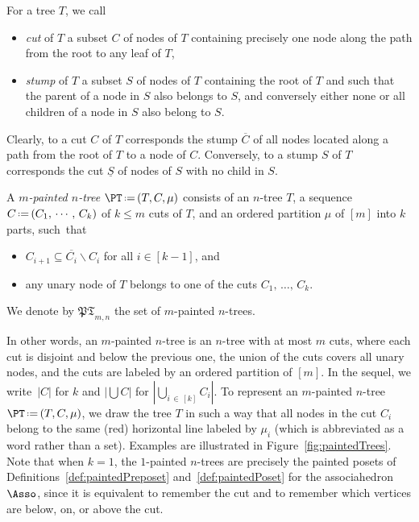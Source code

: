 \documentclass[AHL,Unicode,longabstracts,published]{cedram}
\newcommand{\f}[1]{\mathfrak{#1}}
\newcommand{\ssm}{\smallsetminus}
\newcommand{\eqdef}{\mbox{\,\raisebox{0.2ex}{\scriptsize\ensuremath{\mathrm:}}\ensuremath{=}\,}}
\newcommand{\stump}[1]{\overline{#1}}
\newcommand{\cut}[1]{\underline{#1}}
\begin{document}
\begin{defi}\label{def:stumpCut}
For a tree $T$, we call
\begin{itemize}
\item
\emph{cut} of $T$ a subset $C$ of nodes of $T$ containing precisely one node along the path from the root to any leaf of $T$,
\item
\emph{stump} of $T$ a subset $S$ of nodes of $T$ containing the root of $T$ and such that the parent of a node in $S$ also belongs to $S$, and conversely either none or all children of a node in $S$ also belong to $S$.
\end{itemize}
Clearly, to a cut $C$ of $T$ corresponds the stump $\stump{C}$ of all nodes located along a path from the root of $T$ to a node of $C$. Conversely, to a stump $S$ of $T$ corresponds the cut $\cut{S}$ of nodes of $S$ with no child in $S$.
\end{defi}

\begin{defi}\label{def:paintedTree}
A
\emph{$m$-painted $n$-tree} $\PT \eqdef (T, C, \mu)$ consists of an $n$-tree $T$, a sequence $C \eqdef (C_1,\, \cdots,\,C_k)$ of $k \le m$ cuts of $T$, and an ordered partition $\mu$ of $[m]$ into $k$ parts, such~that
\begin{itemize}
\item $C_{i+1} \subseteq \stump{C_i} \ssm C_i$ for all $i \in [k-1]$, and
\item any unary node of $T$ belongs to one of the cuts $C_1,\,\dots,\, C_k$.
\end{itemize}
We denote by $\f{PT}_{m,n}$ the set of $m$-painted $n$-trees.
\end{defi}

In other words, an $m$-painted $n$-tree is an $n$-tree with at most $m$ cuts, where each cut is disjoint and below the previous one, the union of the cuts covers all unary nodes, and the cuts are labeled by an ordered partition of $[m]$. In the sequel, we write~$|C|$ for $k$ and $|\bigcup C|$ for $|\bigcup_{i\,\in\,[k]} C_i|$. To represent an $m$-painted $n$-tree $\PT \eqdef (T, C, \mu)$, we draw the tree $T$ in such a way that all nodes in the cut $C_i$ belong to the same (red) horizontal line labeled by $\mu_i$ (which is abbreviated as a word rather than a set). Examples are illustrated in Figure~\ref{fig:paintedTrees}. Note that when $k = 1$, the $1$-painted $n$-trees are precisely the painted posets of Definitions~\ref{def:paintedPreposet} and~\ref{def:paintedPoset} for the associahedron~$\Asso$, since it is equivalent to remember the cut and to remember which vertices are below, on, or above the cut.
\end{document}

